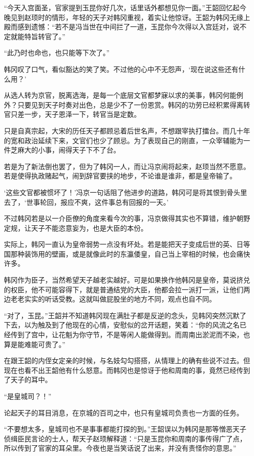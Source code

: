 “今天入宫面圣，官家提到玉昆你好几次，话里话外都想见你一面。”王韶回忆起今晚见到赵顼时的情形，年轻的天子对韩冈重视，着实让他惊讶。王韶为韩冈无缘上殿而感到遗憾：“若不是冯当世在中间拦了一道，玉昆你今次得以入宫廷对，说不定就能特旨转官了。”

“此乃时也命也，也只能等下次了。”

韩冈叹了口气，看似豁达的笑了笑。不过他的心中不无怨声，‘现在说这些还有什么用？’

从选人转为京官，脱离选海，是每一个底层文官都梦寐以求的美事，韩冈何能例外？只要见到天子时奏对出色，总是少不了一份恩赏。韩冈的功劳已经积累得离转官只差一步，天子恩泽一下，转官当是定数。

只是自真宗起，大宋的历任天子都顾忌着后世名声，不想跟宰执打擂台。而几十年的宽和政治延续下来，文官们也少了顾忌。为了表现自己的刚直，一众宰辅能为一件芝麻大的小事，闹得天子下不了台。

若是为了新法倒也罢了，但为了韩冈一人，而让冯京闹将起来，赵顼当然不愿意。若是使得执政赌起气，闹到辞官要挟的地步，不论谁是谁非，都是皇帝输了。

‘这些文官都被惯坏了！’冯京一句话阻了他进步的道路，韩冈可是将其恨到骨头里去了，‘世事轮回，报应不爽，这件事总有回报的一天。’

不过韩冈若是以一介臣僚的角度来看今次的事，冯京做得其实也不算错，维护朝野定规，让天子不能恣意妄为，也是大臣的本份。

实际上，韩冈一直认为皇帝弱势一点没有坏处。若是能把天子变成后世的英、日等国那种装饰用的壁画，或是就像此时的东瀛倭皇，自己当上宰相的时候，也会痛快许多。

韩冈作为臣子，当然希望天子越老实越好。可是如果换作他韩冈是皇帝，莫说挤兑的权臣，他不可能容得下，就是普通结党的大臣，他都会拉一派打一派，让他们两边老老实实的听话受教。这就叫做屁股坐的地方不同，观点也自不同。

“对了，玉昆。”王韶并不知道韩冈现在满肚子都是反逆的念头，见韩冈突然沉默了下去，以为触及到了他现在的心情，安慰似的岔开话题，笑着：“你的风流之名已经传到了宫中，让花魁为你守节，不是等闲人能做得到。而周南出淤泥而不染，也算是能难能可贵了。”

在跟王韶的内侄女定亲的时候，与名妓勾勾搭搭，从情理上的确有些说不过去。但现在也看不出王韶他有什么怒意。而韩冈也是惊讶于他和周南的事，竟然已经传到了天子的耳中。

“是皇城司？！”

论起天子的耳目消息，在京城的百司之中，也只有皇城司负责也一方面的任务。

“不要想太多，皇城司也不是事事都能打探的到。”王韶误以为韩冈是那等憎恶天子侦缉臣民言论的士人，帮天子赵顼解释道：“只是玉昆你和周南的事传得广了点，所以传到了官家的耳朵里。今夜也是当笑话说了出来，并没有责怪你的意思。”

